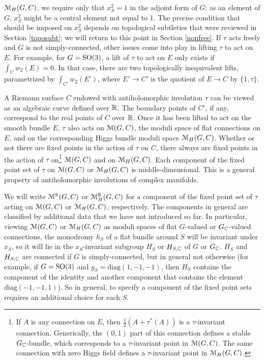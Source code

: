 \documentclass[11pt,a4paper]{article}
\begin{document}
${\mathcal M}_H(G,C)$, we require only that $x_S^2=1$ in the adjoint form of $G$; as an element of $G$, $x_S^2$ might be a central element not equal to 1.
The precise condition that should be imposed on $x_S^2$ depends on topological subtleties that were reviewed in Section \ref{toposubt}; we will return to this point in Section \ref{nonfree}.   
If $\tau$ acts freely and $G$ is not simply-connected, other issues
come into play in lifting $\tau$ to act on $E$. For example, for $G={\mathrm{SO}}(3)$, a lift of $\tau$ to act on $E$ only exists if $\int_C w_2(E)=0$.   
In that case, there are two topologically
inequivalent lifts, parametrized by $\int_{C'}w_2(E')$, where $E'\to C'$ is the quotient of $E\to C$ by $\{1,\tau\}$.
  
 A Riemann surface $C$ endowed with 
antiholomorphic involution $\tau$ can be viewed as an algebraic curve  defined over ${\mathbb{R}}$.   The boundary points of $C'$, if any,
correspond to the real points of $C$ over ${\mathbb{R}}$. Once it has been lifted to act on the smooth bundle $E$,
  $\tau$ also acts on ${\mathcal M}(G,C)$, the moduli space of flat connections on $E$, and on the
corresponding Higgs bundle moduli space ${\mathcal M}_H(G,C)$.  Whether or not there are fixed points in the action of $\tau$ on $C$, there always
are fixed points in the action of $\tau$ on\footnote{If $A$ is any connection on $E$, then $\frac{1}{2}(A+\tau^*(A))$ is a $\tau$-invariant connection.
Generically, the $(0,1)$ part of this connection defines a stable $G_{\mathbb C}$-bundle, which corresponds to a $\tau$-invariant point in ${\mathcal M}(G,C)$.   The
same connection with zero Higgs field defines a $\tau$-invariant point in ${\mathcal M}_H(G,C)$.}
${\mathcal M}(G,C)$ and on ${\mathcal M}_H(G,C)$.    Each component of the fixed point set of $\tau$ on ${\mathcal M}(G,C)$ or ${\mathcal M}_H(G,C)$ is middle-dimensional.   This
is a general property of antiholomorphic involutions of complex manifolds.   
 
 We will write ${\mathcal M}^{\mathbb{R}}(G,C)$ or ${\mathcal M}_H^{\mathbb{R}}(G,C)$ for a component of the fixed point set of $\tau$ acting on ${\mathcal M}(G,C)$ or ${\mathcal M}_H(G,C)$, respectively.
 The components in general are classified by additional data that we have not introduced so far.  In particular, viewing ${\mathcal M}(G,C)$ or ${\mathcal M}_H(G,C)$
 as moduli spaces of flat $G$-valued  or $G_{\mathbb C}$-valued connections, 
  the monodromy $h_S$ of a flat bundle around $S$ will be invariant under $x_S$,
  so it will lie in the $x_S$-invariant subgroup $H_S$ or $H_{S,{\mathbb C}}$ of $G$ or $G_{\mathbb C}$.   $H_S$ and $H_{S,{\mathbb C}}$ are
   connected if $G$ is simply-connected, but in general not otherwise
  (for example, if $G={\mathrm{SO}}(3)$ and $g_S=\mathrm{diag}(1,-1,-1)$, then $H_S$ contains the component of the identity and another component
  that contains the element $\mathrm{diag}(-1,-1,1)$).   So in general, to specify a component of the fixed point sets requires an additional choice for each $S$.
  
\end{document}
